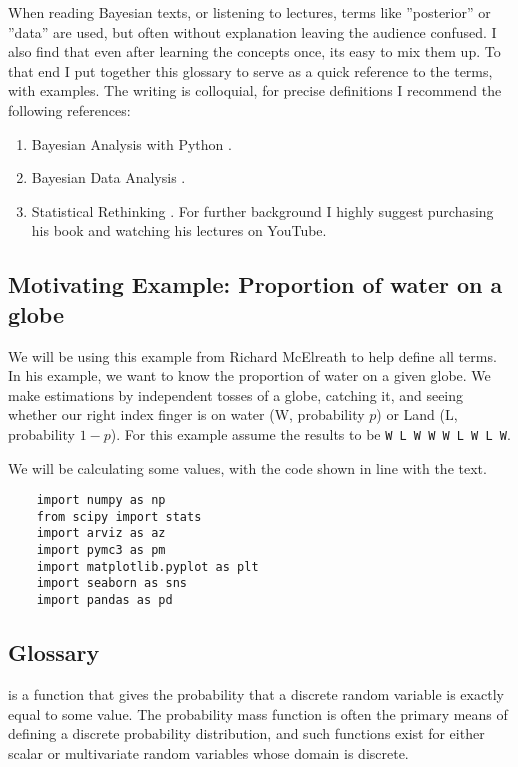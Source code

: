 When reading Bayesian texts, or listening to lectures, terms like ''posterior'' or ''data'' are used, but often without explanation leaving the audience confused. I also find that even after learning the concepts once, its easy to mix them up. To that end I put together this glossary to serve as a quick reference to the terms, with examples. The writing is colloquial, for precise definitions I recommend the following references:
\begin{enumerate}
\item Bayesian Analysis with Python \cite{martin2018}. 
\item Bayesian Data Analysis \cite{gelmanbda04}.
\item Statistical Rethinking \cite{McElreath2015}. For further background I highly suggest purchasing his book and watching his lectures on YouTube.
\end{enumerate}

\subsection{Motivating Example: Proportion of water on a globe}

We will be using this example from Richard McElreath \cite{McElreath2015} to help define all terms. In his example, we want to know the proportion of water on a given globe. We make estimations by independent tosses of a globe, catching it, and seeing whether our right index finger is on water (W, probability $p$) or Land (L, probability $1-p$).  For this example assume the results to be \lstinline{W L W W W L W L W}.

We will be calculating some values, with the code shown in line with the text.
\begin{lstlisting}
    import numpy as np
    from scipy import stats
    import arviz as az
    import pymc3 as pm
    import matplotlib.pyplot as plt
    import seaborn as sns
    import pandas as pd
\end{lstlisting}

\subsection{Glossary}

 is a function that gives the probability that a discrete random variable is exactly equal to some value. The probability mass function is often the primary means of defining a discrete probability distribution, and such functions exist for either scalar or multivariate random variables whose domain is discrete.

